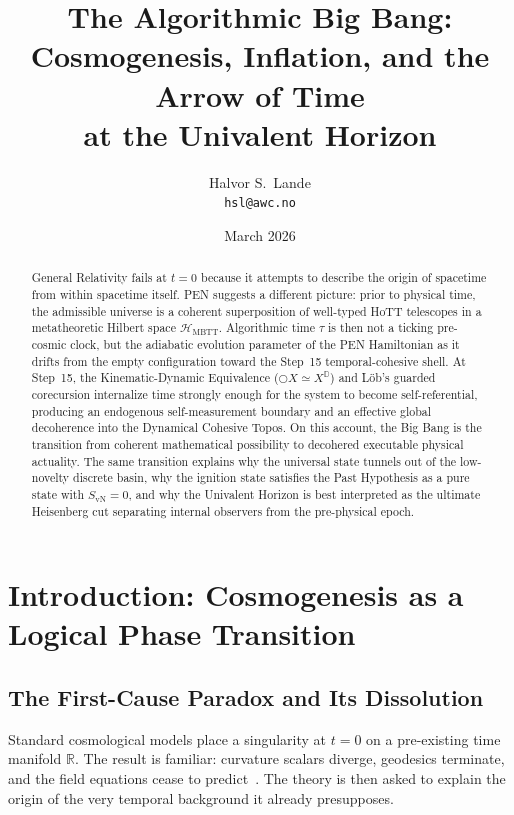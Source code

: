 \documentclass[11pt,a4paper]{article}
\title{\textbf{The Algorithmic Big Bang:\\
Cosmogenesis, Inflation, and the Arrow of Time\\
at the Univalent Horizon}}
\author{Halvor S.\ Lande\\
\texttt{hsl@awc.no}}
\date{March 2026}
\theoremstyle{plain}
\theoremstyle{definition}
\theoremstyle{remark}
\newcommand{\R}{\mathbb{R}}
\newcommand{\D}{\mathbb{D}}
\newcommand{\nextmod}{\bigcirc}
\newcommand{\SvN}{S_{\mathrm{vN}}}
\newcommand{\HMBTT}{\mathcal{H}_{\mathrm{MBTT}}}
\begin{document}
\maketitle

\begin{abstract}
General Relativity fails at $t = 0$ because it attempts to describe the origin of spacetime from within spacetime itself.
PEN suggests a different picture: prior to physical time, the admissible universe is a coherent superposition of well-typed HoTT telescopes in a metatheoretic Hilbert space $\HMBTT$.
Algorithmic time $\tau$ is then not a ticking pre-cosmic clock, but the adiabatic evolution parameter of the PEN Hamiltonian as it drifts from the empty configuration toward the Step~15 temporal-cohesive shell.
At Step~15, the Kinematic-Dynamic Equivalence ($\nextmod X \simeq X^{\D}$) and L\"ob's guarded corecursion internalize time strongly enough for the system to become self-referential, producing an endogenous self-measurement boundary and an effective global decoherence into the Dynamical Cohesive Topos.
On this account, the Big Bang is the transition from coherent mathematical possibility to decohered executable physical actuality.
The same transition explains why the universal state tunnels out of the low-novelty discrete basin, why the ignition state satisfies the Past Hypothesis as a pure state with $\SvN = 0$, and why the Univalent Horizon is best interpreted as the ultimate Heisenberg cut separating internal observers from the pre-physical epoch.
\end{abstract}

\section{Introduction: Cosmogenesis as a Logical Phase Transition}
\label{sec:introduction}

\subsection{The First-Cause Paradox and Its Dissolution}

Standard cosmological models place a singularity at $t = 0$ on a pre-existing time manifold $\R$.
The result is familiar: curvature scalars diverge, geodesics terminate, and the field equations cease to predict~\cite{hawking-ellis,wald}.
The theory is then asked to explain the origin of the very temporal background it already presupposes.
\end{document}
